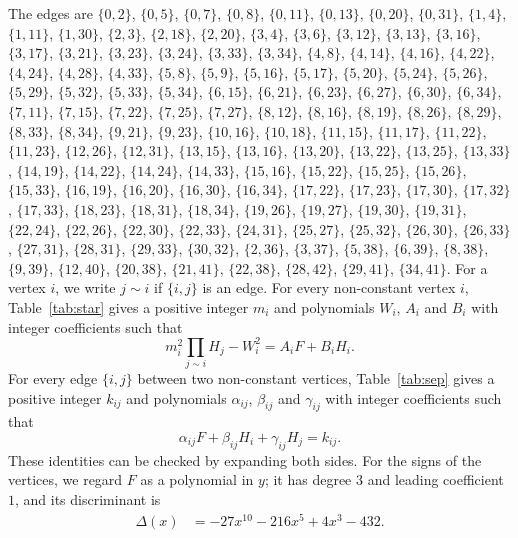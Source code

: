 \documentclass[11pt]{article}
\begin{document}
The edges are $\{0,2\}$, $\{0,5\}$, $\{0,7\}$, $\{0,8\}$, $\{0,11\}$, $\{0,13\}$, $\{0,20\}$, $\{0,31\}$, $\{1,4\}$, $\{1,11\}$, $\{1,30\}$, $\{2,3\}$, $\{2,18\}$, $\{2,20\}$, $\{3,4\}$, $\{3,6\}$, $\{3,12\}$, $\{3,13\}$, $\{3,16\}$, $\{3,17\}$, $\{3,21\}$, $\{3,23\}$, $\{3,24\}$, $\{3,33\}$, $\{3,34\}$, $\{4,8\}$, $\{4,14\}$, $\{4,16\}$, $\{4,22\}$, $\{4,24\}$, $\{4,28\}$, $\{4,33\}$, $\{5,8\}$, $\{5,9\}$, $\{5,16\}$, $\{5,17\}$, $\{5,20\}$, $\{5,24\}$, $\{5,26\}$, $\{5,29\}$, $\{5,32\}$, $\{5,33\}$, $\{5,34\}$, $\{6,15\}$, $\{6,21\}$, $\{6,23\}$, $\{6,27\}$, $\{6,30\}$, $\{6,34\}$, $\{7,11\}$, $\{7,15\}$, $\{7,22\}$, $\{7,25\}$, $\{7,27\}$, $\{8,12\}$, $\{8,16\}$, $\{8,19\}$, $\{8,26\}$, $\{8,29\}$, $\{8,33\}$, $\{8,34\}$, $\{9,21\}$, $\{9,23\}$, $\{10,16\}$, $\{10,18\}$, $\{11,15\}$, $\{11,17\}$, $\{11,22\}$, $\{11,23\}$, $\{12,26\}$, $\{12,31\}$, $\{13,15\}$, $\{13,16\}$, $\{13,20\}$, $\{13,22\}$, $\{13,25\}$, $\{13,33\}$, $\{14,19\}$, $\{14,22\}$, $\{14,24\}$, $\{14,33\}$, $\{15,16\}$, $\{15,22\}$, $\{15,25\}$, $\{15,26\}$, $\{15,33\}$, $\{16,19\}$, $\{16,20\}$, $\{16,30\}$, $\{16,34\}$, $\{17,22\}$, $\{17,23\}$, $\{17,30\}$, $\{17,32\}$, $\{17,33\}$, $\{18,23\}$, $\{18,31\}$, $\{18,34\}$, $\{19,26\}$, $\{19,27\}$, $\{19,30\}$, $\{19,31\}$, $\{22,24\}$, $\{22,26\}$, $\{22,30\}$, $\{22,33\}$, $\{24,31\}$, $\{25,27\}$, $\{25,32\}$, $\{26,30\}$, $\{26,33\}$, $\{27,31\}$, $\{28,31\}$, $\{29,33\}$, $\{30,32\}$, $\{2,36\}$, $\{3,37\}$, $\{5,38\}$, $\{6,39\}$, $\{8,38\}$, $\{9,39\}$, $\{12,40\}$, $\{20,38\}$, $\{21,41\}$, $\{22,38\}$, $\{28,42\}$, $\{29,41\}$, $\{34,41\}$. For a vertex $i$, we write $j\sim i$ if $\{i,j\}$ is an edge.
For every non-constant vertex $i$, Table~\ref{tab:star} gives a positive integer $m_{i}$ and polynomials $W_{i}$, $A_{i}$ and $B_{i}$ with integer coefficients such that
\begin{equation}\label{eq:star}
m_i^2\prod_{j\sim i}H_j-W_i^2=A_iF+B_iH_i.
\end{equation}
For every edge $\{i,j\}$ between two non-constant vertices, Table~\ref{tab:sep} gives a positive integer $k_{ij}$ and polynomials $\alpha_{ij}$, $\beta_{ij}$ and $\gamma_{ij}$ with integer coefficients such that
\begin{equation}\label{eq:sep}
\alpha_{ij}F+\beta_{ij}H_i+\gamma_{ij}H_j=k_{ij}.
\end{equation}
These identities can be checked by expanding both sides.
For the signs of the vertices, we regard $F$ as a polynomial in $y$; it has degree $3$ and leading coefficient $1$, and its discriminant is
\begin{align*}
\Delta(x)&=-27x^{10}-216x^{5}+4x^{3}-432.
\end{align*}
\end{document}
